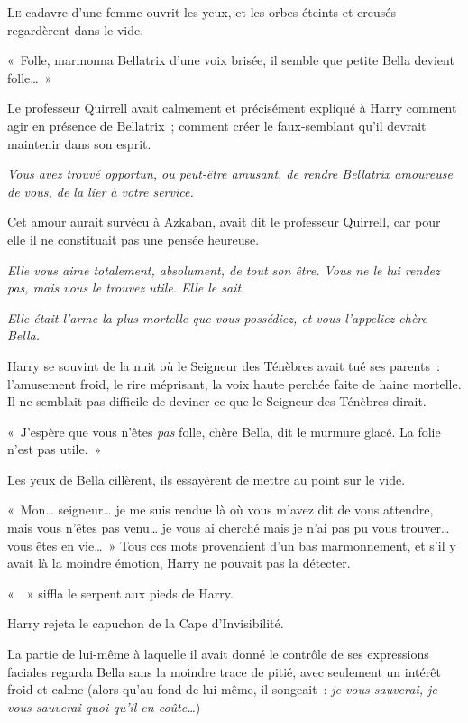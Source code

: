
\lettrine{L}{e} cadavre d'une femme ouvrit les yeux, et les orbes éteints et creusés regardèrent dans le vide.

«~Folle, marmonna Bellatrix d'une voix brisée, il semble que petite Bella devient folle…~»

Le professeur Quirrell avait calmement et précisément expliqué à Harry comment agir en présence de Bellatrix~; comment créer le faux-semblant qu'il devrait maintenir dans son esprit.

\emph{Vous avez trouvé opportun, ou peut-être amusant, de rendre Bellatrix amoureuse de vous, de la lier à votre service.}

Cet amour aurait survécu à Azkaban, avait dit le professeur Quirrell, car pour elle il ne constituait pas une pensée heureuse.

\emph{Elle vous aime totalement, absolument, de tout son être. Vous ne le lui rendez pas, mais vous le trouvez utile. Elle le sait.}

\emph{Elle était l'arme la plus mortelle que vous possédiez, et vous l'appeliez chère Bella.}

Harry se souvint de la nuit où le Seigneur des Ténèbres avait tué ses parents~: l'amusement froid, le rire méprisant, la voix haute perchée faite de haine mortelle. Il ne semblait pas difficile de deviner ce que le Seigneur des Ténèbres dirait.

«~J'espère que vous n'êtes \emph{pas} folle, chère Bella, dit le murmure glacé. La folie n'est pas utile.~»

Les yeux de Bella cillèrent, ils essayèrent de mettre au point sur le vide.

«~Mon… seigneur… je me suis rendue là où vous m'avez dit de vous attendre, mais vous n'êtes pas venu… je vous ai cherché mais je n'ai pas pu vous trouver… vous êtes en vie…~» Tous ces mots provenaient d'un bas marmonnement, et s'il y avait là la moindre émotion, Harry ne pouvait pas la détecter.

«~~» siffla le serpent aux pieds de Harry.

Harry rejeta le capuchon de la Cape d'Invisibilité.

La partie de lui-même à laquelle il avait donné le contrôle de ses expressions faciales regarda Bella sans la moindre trace de pitié, avec seulement un intérêt froid et calme (alors qu'au fond de lui-même, il songeait~: \emph{je vous sauverai, je vous sauverai quoi qu'il en coûte…})

